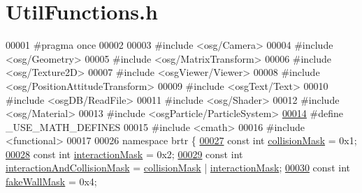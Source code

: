 \hypertarget{_util_functions_8h_source}{\section{Util\+Functions.\+h}
\label{_util_functions_8h_source}
}

\begin{DoxyCode}
00001 \textcolor{preprocessor}{#pragma once}
00002 
00003 \textcolor{preprocessor}{#include <osg/Camera>}
00004 \textcolor{preprocessor}{#include <osg/Geometry>}
00005 \textcolor{preprocessor}{#include <osg/MatrixTransform>}
00006 \textcolor{preprocessor}{#include <osg/Texture2D>}
00007 \textcolor{preprocessor}{#include <osgViewer/Viewer>}
00008 \textcolor{preprocessor}{#include <osg/PositionAttitudeTransform>}
00009 \textcolor{preprocessor}{#include <osgText/Text>}
00010 \textcolor{preprocessor}{#include <osgDB/ReadFile>}
00011 \textcolor{preprocessor}{#include <osg/Shader>}
00012 \textcolor{preprocessor}{#include <osg/Material>}
00013 \textcolor{preprocessor}{#include <osgParticle/ParticleSystem>}
\hypertarget{_util_functions_8h_source_l00014}{}\hyperlink{_util_functions_8h_a525335710b53cb064ca56b936120431e}{00014} \textcolor{preprocessor}{#define \_USE\_MATH\_DEFINES}
00015 \textcolor{preprocessor}{#include <cmath>} 
00016 \textcolor{preprocessor}{#include <functional>}
00017 
00026 \textcolor{keyword}{namespace }brtr \{
\hypertarget{_util_functions_8h_source_l00027}{}\hyperlink{namespacebrtr_af79a815819e2ef65ea9cd43dc9d43679}{00027}     \textcolor{keyword}{const} \textcolor{keywordtype}{int} \hyperlink{namespacebrtr_af79a815819e2ef65ea9cd43dc9d43679}{collisionMask} = 0x1;      
\hypertarget{_util_functions_8h_source_l00028}{}\hyperlink{namespacebrtr_a2060f4d70c0e3bc7e2e35f82e279a40d}{00028}     \textcolor{keyword}{const} \textcolor{keywordtype}{int} \hyperlink{namespacebrtr_a2060f4d70c0e3bc7e2e35f82e279a40d}{interactionMask} = 0x2;
\hypertarget{_util_functions_8h_source_l00029}{}\hyperlink{namespacebrtr_a21ab851f18c0c85fa006766034833a4f}{00029}     \textcolor{keyword}{const} \textcolor{keywordtype}{int} \hyperlink{namespacebrtr_a21ab851f18c0c85fa006766034833a4f}{interactionAndCollisionMask} = 
      \hyperlink{namespacebrtr_af79a815819e2ef65ea9cd43dc9d43679}{collisionMask} | \hyperlink{namespacebrtr_a2060f4d70c0e3bc7e2e35f82e279a40d}{interactionMask};
\hypertarget{_util_functions_8h_source_l00030}{}\hyperlink{namespacebrtr_a5a7668dd62a6cbf00234c926a109fbef}{00030}     \textcolor{keyword}{const} \textcolor{keywordtype}{int} \hyperlink{namespacebrtr_a5a7668dd62a6cbf00234c926a109fbef}{fakeWallMask} = 0x4;

\end{DoxyCode}
